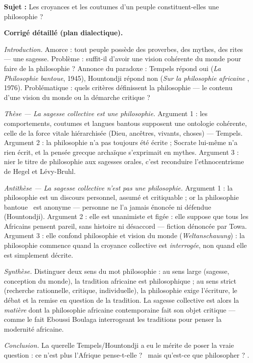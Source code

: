\documentclass[11pt]{article}
\begin{document}
\begin{exoresolu}
\textbf{Sujet :} Les croyances et les coutumes d'un peuple constituent-elles une philosophie ?

\tcblower
\textbf{Corrigé détaillé (plan dialectique).}

\emph{Introduction.} Amorce : tout peuple possède des proverbes, des mythes, des rites — une sagesse. Problème : suffit-il d'avoir une vision cohérente du monde pour faire de la philosophie ? Annonce du paradoxe : Tempels répond oui (\emph{La Philosophie bantoue}, 1945), Hountondji répond non (\emph{Sur la \guillemotleft philosophie africaine \guillemotright}, 1976). Problématique : quels critères définissent la philosophie — le contenu d'une vision du monde ou la démarche critique ?

\emph{Thèse — La sagesse collective est une philosophie.} Argument 1 : les comportements, coutumes et langues bantous supposent une ontologie cohérente, celle de la force vitale hiérarchisée (Dieu, ancêtres, vivants, choses) — Tempels. Argument 2 : la philosophie n'a pas toujours été écrite ; Socrate lui-même n'a rien écrit, et la pensée grecque archaïque s'exprimait en mythes. Argument 3 : nier le titre de philosophie aux sagesses orales, c'est reconduire l'ethnocentrisme de Hegel et Lévy-Bruhl.

\emph{Antithèse — La sagesse collective n'est pas une philosophie.} Argument 1 : la philosophie est un discours personnel, assumé et critiquable ; or la \guillemotleft philosophie bantoue \guillemotright\ est anonyme — personne ne l'a jamais énoncée ni défendue (Hountondji). Argument 2 : elle est unanimiste et figée : elle suppose que tous les Africains pensent pareil, sans histoire ni désaccord — fiction dénoncée par Towa. Argument 3 : elle confond philosophie et vision du monde (\emph{Weltanschauung}) : la philosophie commence quand la croyance collective est \emph{interrogée}, non quand elle est simplement décrite.

\emph{Synthèse.} Distinguer deux sens du mot \guillemotleft philosophie \guillemotright : au sens large (sagesse, conception du monde), la tradition africaine est philosophique ; au sens strict (recherche rationnelle, critique, individuelle), la philosophie exige l'écriture, le débat et la remise en question de la tradition. La sagesse collective est alors la \emph{matière} dont la philosophie africaine contemporaine fait son objet critique — comme le fait Eboussi Boulaga interrogeant les traditions pour penser la modernité africaine.

\emph{Conclusion.} La querelle Tempels/Hountondji a eu le mérite de poser la vraie question : ce n'est plus \guillemotleft l'Afrique pense-t-elle ? \guillemotright\ mais \guillemotleft qu'est-ce que philosopher ? \guillemotright.
\end{exoresolu}
\end{document}
